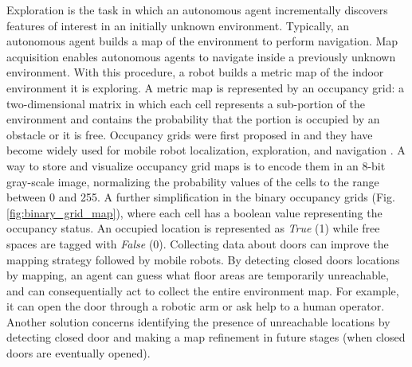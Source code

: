  Exploration is the task in which an autonomous agent incrementally discovers features of interest in an initially unknown environment. Typically, an autonomous agent builds a map of the environment to perform navigation.  Map acquisition enables autonomous agents to navigate inside a previously unknown environment. With this procedure, a robot builds a metric map of the indoor environment it is exploring. A metric map is represented by an occupancy grid: a two-dimensional matrix in which each cell represents a sub-portion of the environment and contains the probability that the portion is occupied by an obstacle or it is free. Occupancy grids were first proposed in \cite{cuupancygridfirst} and they have become widely used for mobile robot localization, exploration, and navigation \cite{gridmapnavigation, ariel, girdmapexploration}. A way to store and visualize occupancy grid maps is to encode them in an 8-bit gray-scale image, normalizing the probability values of the cells to the range between 0
 and 255. A further simplification in the binary occupancy grids (Fig. \ref{fig:binary_grid_map}), where each cell has a boolean value representing the occupancy status. An occupied location is represented as \textit{True} (1) while free spaces are tagged with \textit{False} (0). Collecting data about doors can improve the mapping strategy followed by mobile robots. By detecting closed doors locations by mapping, an agent can guess what floor areas are temporarily unreachable, and can consequentially act to collect the entire environment map. For example, it can open the door through a robotic arm \cite{doorcabinet} or ask help to a human operator. Another solution concerns identifying the presence of unreachable locations by detecting closed door and making a map refinement in future stages (when closed doors are eventually opened).
 
